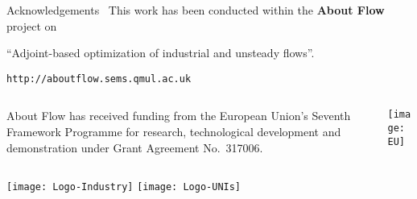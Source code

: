 
\begin{frame}{Acknowledgements}
\
  This work has been conducted within the {\bf About Flow} project on
  \centerline{``Adjoint-based
  optimization of industrial and unsteady flows''.}
  \vfill
  \centerline {\tt http://aboutflow.sems.qmul.ac.uk}

  \vfill\vfill
  \begin{columns}
    \begin{column}{.55\textwidth}
    About Flow has received funding from the European Union's
    Seventh Framework Programme for research, technological development
    and demonstration under Grant Agreement No.~317006.
    \end{column}
    \begin{column}{.36\textwidth}
      \texttt{[image: EU]}
    \end{column}
  \end{columns}
    
\vfill\vfill
\hfil
\texttt{[image: Logo-Industry]}
\hfil
\texttt{[image: Logo-UNIs]}
\hfil

\vspace{-.1\textheight}

\end{frame}
